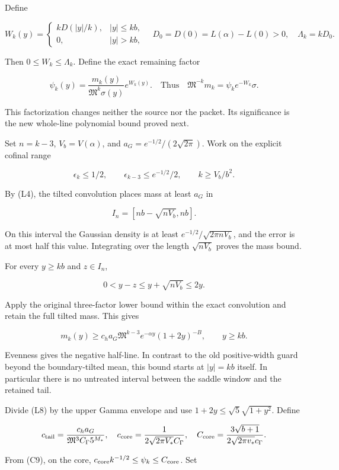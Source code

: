 Define

\[
W_k(y)=\begin{cases}kD(|y|/k),&|y|\le kb,\\0,&|y|>kb,
\end{cases}\quad
D_0=D(0)=L(\alpha)-L(0)>0,\quad\Lambda_k=kD_0.
\tag{L5}
\]

Then \(0\le W_k\le\Lambda_k\). Define the exact remaining factor

\[
\psi_k(y)=\frac{m_k(y)}{\mathfrak M^k\sigma(y)}e^{W_k(y)}.
\quad\text{Thus}\quad
\boxed{\mathfrak M^{-k}m_k=\psi_k e^{-W_k}\sigma.}
\tag{L6}
\]

This factorization changes neither the source nor the packet. Its significance is the new whole-line polynomial bound proved next.

Set \(n=k-3\), \(V_b=V(\alpha)\), and
\(a_G=e^{-1/2}/(2\sqrt{2\pi})\). Work on the explicit cofinal range

\[
\epsilon_k\le1/2,\qquad
\epsilon_{k-3}\le e^{-1/2}/2,\qquad
k\ge V_b/b^2.
\tag{L7}
\]

By (L4), the tilted convolution places mass at least \(a_G\) in

\[
I_n=[nb-\sqrt{nV_b},nb].
\]

On this interval the Gaussian density is at least
\(e^{-1/2}/\sqrt{2\pi nV_b}\), and the error is at most half this value. Integrating over the length \(\sqrt{nV_b}\) proves the mass bound.

For every \(y\ge kb\) and \(z\in I_n\),

\[
0<y-z\le y+\sqrt{nV_b}\le2y.
\]

Apply the original three-factor lower bound within the exact convolution and retain the full tilted mass. This gives

\[
\boxed{m_k(y)\ge c_h a_G\mathfrak M^{k-3}e^{-\alpha y}(1+2y)^{-B},
\qquad y\ge kb.}
\tag{L8}
\]

Evenness gives the negative half-line. In contrast to the old positive-width guard beyond the boundary-tilted mean, this bound starts at \(|y|=kb\) itself. In particular there is no untreated interval between the saddle window and the retained tail.

Divide (L8) by the upper Gamma envelope and use
\(1+2y\le\sqrt5\sqrt{1+y^2}\). Define

\[
c_{\rm tail}=\frac{c_h a_G}{\mathfrak M^3C_\Gamma 5^{M_*}},
\quad
c_{\rm core}=\frac1{2\sqrt{2\pi V_*}C_\Gamma},
\quad
C_{\rm core}=\frac{3\sqrt{b+1}}{2\sqrt{2\pi v_*}c_\Gamma}.
\]

From (C9), on the core,
\(c_{\rm core}k^{-1/2}\le\psi_k\le C_{\rm core}\). Set

